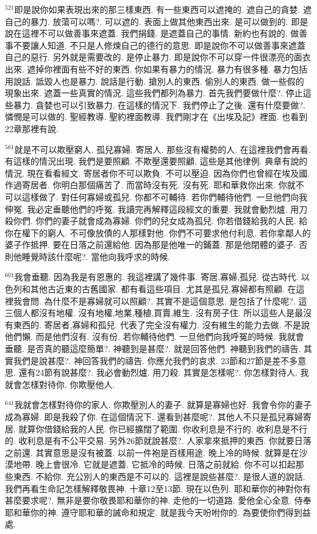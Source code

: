 \documentclass{book}
\begin{document}
$^{521}$即是說你如果表現出來的那三樣東西.
有一些東西可以遮掩的.
遮自己的貪婪.
遮自己的暴力.
放蕩可以嗎?.
可以遮的.
表面上做其他東西出來.
是可以做到的.
即是說在這裡不可以做善事來遮蓋.
我們捐錢.
是遮蓋自己的事情.
新約也有說的.
做善事不要讓人知道.
不只是人修煉自己的德行的意思.
即是說你不可以做善事來遮蓋自己的惡行.
另外就是需要改的.
是停止暴力.
即是說你不可以穿一件很漂亮的面衣出來.
遮掉你裡面有些不好的東西.
你如果有暴力的情況.
暴力有很多種.
暴力包括用說話.
詆毀人也是暴力.
說話是行動.
搶別人的東西.
偷別人的東西.
做一些假的現象出來.
遮蓋一些真實的情況.
這些我們都列為暴力.
首先我們要做什麼?.
停止這些暴力.
貪婪也可以引致暴力.
在這樣的情況下.
我們停止了之後.
還有什麼要做?.
憐憫是可以做的.
聖經教導.
聖約裡面教導.
我們剛才在《出埃及記》裡面.
也看到22章那裡有說.

$^{561}$就是不可以欺壓窮人.
孤兒寡婦.
寄居人.
那些沒有權勢的人.
在這裡我們會再看.
有這樣的情況出現.
我們是要照顧.
不欺壓還要照顧.
這些是其他律例.
典章有說的情況.
現在看看經文.
寄居者你不可以欺負.
不可以壓迫.
因為你們也曾經在埃及國.
作過寄居者.
你明白那個痛苦了.
而當時沒有死.
沒有死.
耶和華救你出來.
你就不可以這樣做了.
對任何寡婦或孤兒.
你都不可輔待.
若你們輔待他們.
一旦他們向我伸冤.
我必定垂聽他們的呼冤.
我讀完再解釋這段經文的重要.
我就會動烈爐.
用刀殺你們.
你們的妻子就會成為寡婦.
你們的兒女成為孤兒.
你若借錢給我的人民.
給你在權下的窮人.
不可像放債的人那樣對他.
你們不可要求他付利息.
若你拿鄰人的婆子作抵押.
要在日落之前還給他.
因為那是他唯一的鋪蓋.
那是他閉體的婆子.
否則他睡覺時該什麼呢?.
當他向我呼求的時候.

$^{601}$我會垂聽.
因為我是有恩惠的.
我這裡講了幾件事.
寄居,寡婦,孤兒.
從古時代.
以色列和其他古近東的古舊國家.
都有看這些項目.
尤其是孤兒,寡婦都有照顧.
在這裡我會問.
為什麼不是寡婦就可以照顧?.
其實不是這個意思.
是包括了什麼呢?.
這三個人都沒有地權.
沒有地權,地業,種植,買賣,維生.
沒有房子住.
所以這些人是最沒有東西的.
寄居者,寡婦和孤兒.
代表了完全沒有權力.
沒有維生的能力去做.
不是說他們懶.
而是他們沒有.
沒有份.
若你輔待他們.
一旦他們向我呼冤的時候.
我就會垂聽.
是否真的聽這麼簡單?.
神聽到是甚麼?.
就是回答他們.
神聽到我們的禱告.
其實我們是說甚麼?.
神回答我們的禱告.
你應允我們的哀求.
23節和27節是差不多意思.
還有24節有說甚麼?.
我必會動烈爐.
用刀殺.
其實是怎樣呢?.
你怎樣對待人.
我就會怎樣對待你.
你欺壓他人.

$^{641}$我就會怎樣對待你的家人.
你欺壓別人的妻子.
就算是寡婦也好.
我會令你的妻子成為寡婦.
即是我殺了你.
在這個情況下.
還看到甚麼呢?.
其他人不只是孤兒寡婦寄居.
就算你借錢給我的人民.
你已經擴闊了範圍.
你收利息是不行的.
收利息是不行的.
收利息是有不公平交易.
另外26節就說甚麼?.
人家拿來抵押的東西.
你就要日落之前還.
其實意思是沒有被蓋.
以前一件袍是百樣用途.
晚上冷的時候.
就算是在沙漠地帶.
晚上會很冷.
它就是遮蓋.
它抵冷的時候.
日落之前就給.
你不可以扣起那些東西.
不給你.
充公別人的東西是不可以的.
這裡是說些甚麼?.
是很人道的說話.
我們再看生命記怎樣解釋敬畏神.
十章12至13節.
現在以色列.
耶和華你的神對你有甚麼要求呢?.
無非是要你敬畏耶和華你的神.
走他的一切道路.
愛他全心全意.
侍奉耶和華你的神.
遵守耶和華的誡命和規定.
就是我今天吩咐你的.
為要使你們得到益處.
\end{document}
